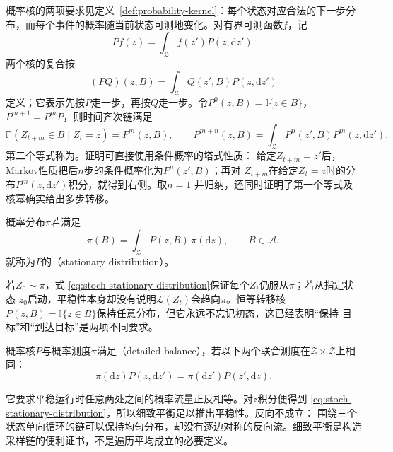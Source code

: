 概率核的两项要求见定义~\ref{def:probability-kernel}：每个状态对应合法的下一步分布，而每个事件的概率随当前状态可测地变化。对有界可测函数$f$，记
\[
  Pf(z)=\int_{\mathcal{Z}}f(z')P(z,\mathrm{d}z').
\]
两个核的复合按
\[
  (PQ)(z,B)
  =
  \int_{\mathcal{Z}}Q(z',B)P(z,\mathrm{d}z')
\]
定义；它表示先按$P$走一步，再按$Q$走一步。令$P^0(z,B)=\mathbb{I}\{z\in B\}$，
$P^{m+1}=P^mP$，则时间齐次链满足
\begin{equation}
  \mathbb{P}(Z_{t+m}\in B\mid Z_t=z)=P^m(z,B),
  \qquad
  P^{m+n}(z,B)
  =
  \int_{\mathcal{Z}}P^n(z',B)P^m(z,\mathrm{d}z').
  \label{eq:stoch-chapman-kolmogorov}
\end{equation}
第二个等式称为。证明可直接使用条件概率的塔式性质：
给定$Z_{t+m}=z'$后，Markov性质把后$n$步的条件概率化为$P^n(z',B)$；再对
$Z_{t+m}$在给定$Z_t=z$时的分布$P^m(z,\mathrm{d}z')$积分，就得到右侧。取$n=1$
并归纳，还同时证明了第一个等式及核幂确实给出多步转移。

\begin{definition}[平稳分布]
  \label{def:stoch-stationary-distribution}
概率分布$\pi$若满足
\begin{equation}
  \pi(B)=\int_{\mathcal{Z}}P(z,B)\,\pi(\mathrm{d}z),
  \qquad B\in\mathcal{A},
  \label{eq:stoch-stationary-distribution}
\end{equation}
就称为$P$的（stationary distribution）。
\end{definition}
若$Z_0\sim\pi$，式
\eqref{eq:stoch-stationary-distribution}保证每个$Z_t$仍服从$\pi$；若从指定状态
$z_0$启动，平稳性本身却没有说明$\mathcal{L}(Z_t)$会趋向$\pi$。恒等转移核
$P(z,B)=\mathbb{I}\{z\in B\}$保持任意分布，但它永远不忘记初态，这已经表明“保持
目标”和“到达目标”是两项不同要求。

\begin{definition}[细致平衡]
  \label{def:stoch-detailed-balance}
概率核\(P\)与概率测度\(\pi\)满足（detailed balance），若以下两个联合测度在\(\mathcal Z\times\mathcal Z\)上相同：
\begin{equation}
  \pi(\mathrm{d}z)P(z,\mathrm{d}z')
  =\pi(\mathrm{d}z')P(z',\mathrm{d}z).
  \label{eq:stoch-detailed-balance}
\end{equation}
\end{definition}
它要求平稳运行时任意两处之间的概率流量正反相等。对$z$积分便得到
\eqref{eq:stoch-stationary-distribution}，所以细致平衡足以推出平稳性。反向不成立：
围绕三个状态单向循环的链可以保持均匀分布，却没有逐边对称的反向流。细致平衡是构造
采样链的便利证书，不是遍历平均成立的必要定义。
